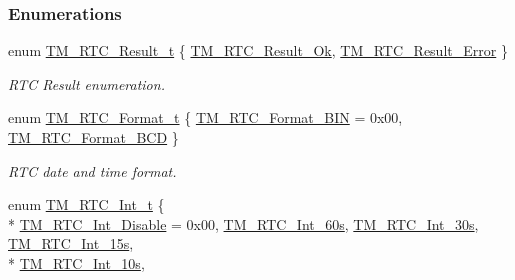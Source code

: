 \subsubsection*{Enumerations}
\begin{DoxyCompactItemize}
\item 
enum \hyperlink{group___t_m___r_t_c___typedefs_gaad29b647ee0def818f3b9efc717731f8}{T\+M\+\_\+\+R\+T\+C\+\_\+\+Result\+\_\+t} \{ \hyperlink{group___t_m___r_t_c___typedefs_ggaad29b647ee0def818f3b9efc717731f8ab3ceefc4a5b384fbd0097705e535a36c}{T\+M\+\_\+\+R\+T\+C\+\_\+\+Result\+\_\+\+Ok}, 
\hyperlink{group___t_m___r_t_c___typedefs_ggaad29b647ee0def818f3b9efc717731f8aad05d660a457ab908300b74873595acb}{T\+M\+\_\+\+R\+T\+C\+\_\+\+Result\+\_\+\+Error}
 \}
\begin{DoxyCompactList}\small\item\em R\+T\+C Result enumeration. \end{DoxyCompactList}\item 
enum \hyperlink{group___t_m___r_t_c___typedefs_ga4ef7bf7d2c67f2dc6208ecb5926b0354}{T\+M\+\_\+\+R\+T\+C\+\_\+\+Format\+\_\+t} \{ \hyperlink{group___t_m___r_t_c___typedefs_gga4ef7bf7d2c67f2dc6208ecb5926b0354ae48695293a3f8d72c95a88afff4d44e5}{T\+M\+\_\+\+R\+T\+C\+\_\+\+Format\+\_\+\+B\+I\+N} = 0x00, 
\hyperlink{group___t_m___r_t_c___typedefs_gga4ef7bf7d2c67f2dc6208ecb5926b0354afe6637c02d11e68c7e190dbef8381b60}{T\+M\+\_\+\+R\+T\+C\+\_\+\+Format\+\_\+\+B\+C\+D}
 \}
\begin{DoxyCompactList}\small\item\em R\+T\+C date and time format. \end{DoxyCompactList}\item 
enum \hyperlink{group___t_m___r_t_c___typedefs_ga05e753ad5f63f28a20fe9f3b85e799f2}{T\+M\+\_\+\+R\+T\+C\+\_\+\+Int\+\_\+t} \{ \\*
\hyperlink{group___t_m___r_t_c___typedefs_gga05e753ad5f63f28a20fe9f3b85e799f2a0ad3976b890949bd566913a5a346373b}{T\+M\+\_\+\+R\+T\+C\+\_\+\+Int\+\_\+\+Disable} = 0x00, 
\hyperlink{group___t_m___r_t_c___typedefs_gga05e753ad5f63f28a20fe9f3b85e799f2a14b3a6859ea6fae5cbd90183e6b75a17}{T\+M\+\_\+\+R\+T\+C\+\_\+\+Int\+\_\+60s}, 
\hyperlink{group___t_m___r_t_c___typedefs_gga05e753ad5f63f28a20fe9f3b85e799f2a6844794554d9da4e42f43c1a272434e2}{T\+M\+\_\+\+R\+T\+C\+\_\+\+Int\+\_\+30s}, 
\hyperlink{group___t_m___r_t_c___typedefs_gga05e753ad5f63f28a20fe9f3b85e799f2a613f64eae4037ed606f9aaf2c41169aa}{T\+M\+\_\+\+R\+T\+C\+\_\+\+Int\+\_\+15s}, 
\\*
\hyperlink{group___t_m___r_t_c___typedefs_gga05e753ad5f63f28a20fe9f3b85e799f2a63bac01a68472de21dd3232843540312}{T\+M\+\_\+\+R\+T\+C\+\_\+\+Int\+\_\+10s}, 

\end{DoxyCompactItemize}
